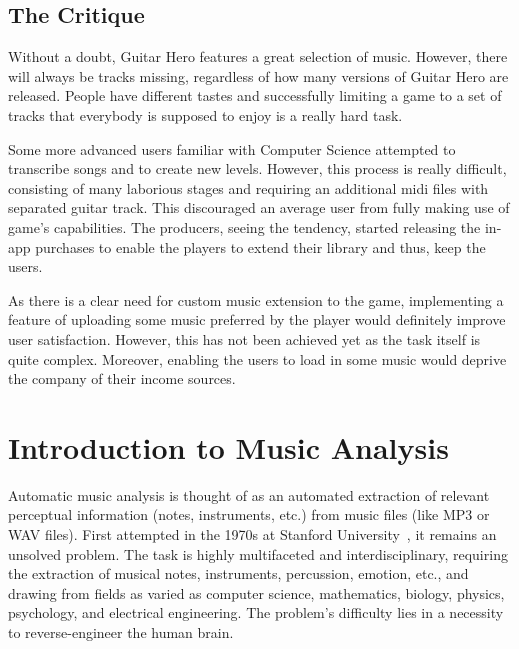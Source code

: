 \vspace{10pt}


\subsection*{The Critique}

Without a doubt, Guitar Hero features a great selection of music. However, there will always be tracks missing, regardless of how many versions of Guitar Hero are released. People have different tastes and successfully limiting a game to a set of tracks that everybody is supposed to enjoy is a really hard task. 

Some more advanced users familiar with Computer Science attempted to transcribe songs and to create new levels. However, this process is really difficult, consisting of many laborious stages and requiring an additional midi files with separated guitar track. This discouraged an average user from fully making use of game’s capabilities. The producers, seeing the tendency, started releasing the in-app purchases to enable the players to extend their library and thus, keep the users. 

As there is a clear need for custom music extension to the game, implementing a feature of uploading some music preferred by the player would definitely improve user satisfaction. However, this has not been achieved yet as the task itself is quite complex. Moreover, enabling the users to load in some music would deprive the company of their income sources.

\vspace{30pt}
\newpage

\section{Introduction to Music Analysis}
\vspace{10pt}


Automatic music analysis is thought of as an automated extraction of relevant perceptual information (notes, instruments, etc.) from music files (like MP3 or WAV files). First attempted in the 1970s at Stanford University~\cite{moorer}, it remains an unsolved problem. The task is highly multifaceted and interdisciplinary, requiring the extraction of musical notes, instruments, percussion, emotion, etc., and drawing from fields as varied as computer science, mathematics, biology, physics, psychology, and electrical engineering. The problem's difficulty lies in a necessity to reverse-engineer the human brain. 

